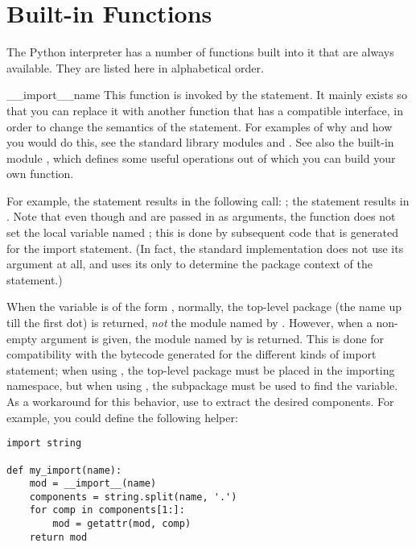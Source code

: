 \section{Built-in Functions \label{built-in-funcs}}

The Python interpreter has a number of functions built into it that
are always available.  They are listed here in alphabetical order.



\begin{funcdesc}{__import__}{name}
  This function is invoked by the 
  statement.  It mainly exists so that you can replace it with another
  function that has a compatible interface, in order to change the
  semantics of the  statement.  For examples of why
  and how you would do this, see the standard library modules
   and
  .  See also the built-in
  module , which defines some useful
  operations out of which you can build your own
   function.

  For example, the statement  results in the
  following call:  
  ; the statement 
  results in .  Note that even though  and
  \code{['eggs']} are passed in as arguments, the
   function does not set the local variable
  named ; this is done by subsequent code that is generated
  for the import statement.  (In fact, the standard implementation
  does not use its  argument at all, and uses its
   only to determine the package context of the
   statement.)

  When the  variable is of the form ,
  normally, the top-level package (the name up till the first dot) is
  returned, \emph{not} the module named by .  However, when
  a non-empty  argument is given, the module named by
   is returned.  This is done for compatibility with the
  bytecode generated for the different kinds of import statement; when
  using , the top-level package 
  must be placed in the importing namespace, but when using , the  subpackage must be used
  to find the  variable.  As a workaround for this
  behavior, use  to extract the desired
  components.  For example, you could define the following helper:

\begin{verbatim}
import string

def my_import(name):
    mod = __import__(name)
    components = string.split(name, '.')
    for comp in components[1:]:
        mod = getattr(mod, comp)
    return mod
\end{verbatim}
\end{funcdesc}

